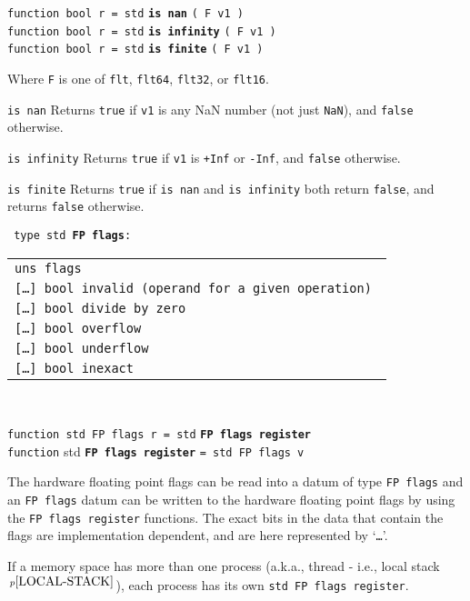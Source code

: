 \documentclass[12pt]{article}
\newcommand{\ttkey}[1]{{\tt \bfseries #1}}
\newcommand{\pagnote}[1]{$\,^{p\pageref{#1}}$}
\newenvironment{indpar}[1][0.3in]%
	{\begin{list}{}%
		     {\setlength{\itemsep}{0in}%
		      \setlength{\topsep}{0in}%
		      \setlength{\parsep}{1ex}%
		      \setlength{\labelwidth}{#1}%
		      \setlength{\leftmargin}{#1}%
		      \addtolength{\leftmargin}{\labelsep}}%
	 \item}%
	{\end{list}}
\newenvironment{itemlist}[1][1.2in]%
	{\begin{list}{}{\setlength{\labelwidth}{#1}%
		        \setlength{\leftmargin}{\labelwidth}%
		        \addtolength{\leftmargin}{+0.2in}%
		        \renewcommand{\makelabel}[1]{##1\hfill}}}%
	{\end{list}}
\begin{document}
{\tt function bool r = std} \ttkey{is nan} {\tt ( F v1 )} \\
{\tt function bool r = std} \ttkey{is infinity} {\tt ( F v1 )} \\
{\tt function bool r = std} \ttkey{is finite} {\tt ( F v1 )}
\begin{indpar}
Where {\tt F} is one of {\tt flt}, {\tt flt64}, {\tt flt32}, or {\tt flt16}.
\begin{itemlist}
\item[\tt is nan]
Returns {\tt true} if {\tt v1} is any NaN number (not just {\tt NaN}),
and {\tt false} otherwise.
\item[\tt is infinity]
Returns {\tt true} if {\tt v1} is {\tt +Inf} or {\tt -Inf}, and {\tt false}
otherwise.
\item[\tt is finite]
Returns {\tt true} if {\tt is nan} and {\tt is infinity}
both return {\tt false}, and returns {\tt false} otherwise.
\end{itemlist}
\end{indpar}

{\tt
type~std~\ttkey{FP flags}:\label{FP-FLAGS} \\
\begin{tabular}[t]{@{~~~~~}l}
\tt uns flags \\
\tt [\ldots] bool invalid (operand for a given operation) \\
\tt [\ldots] bool divide by zero \\
\tt [\ldots] bool overflow \\
\tt [\ldots] bool underflow \\
\tt [\ldots] bool inexact \\
\end{tabular} \\
}
{\tt function std FP flags r = std} \ttkey{FP flags register} \\
{\tt function} std \ttkey{FP flags register} {\tt = std FP flags v}
\begin{indpar}
The hardware floating point flags can be read into a datum of type
{\tt FP flags} and an {\tt FP flags} datum can be written
to the hardware floating point flags by using the {\tt FP flags register}
functions.  The exact bits in the data that contain the flags
are implementation dependent, and are here represented by `{\tt \ldots{}}'.
\end{indpar}

If a memory space has more than one process (a.k.a., thread - i.e., local
stack\pagnote{LOCAL-STACK}), each process has its own
{\tt std FP flags register}.
\end{document}
